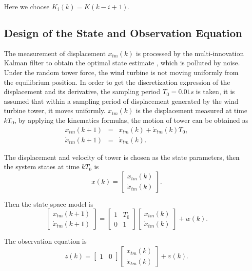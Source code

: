 Here we choose $K_i(k) = K(k-i+1)$.

\subsection{Design of the State and Observation Equation}

The measurement of displacement $x_{tm}(k)$ is processed by the multi-innovation
Kalman filter to obtain the optimal state estimate
, which is polluted by noise. Under the random tower force, the wind turbine
is not moving uniformly from the equilibrium position. In order to get the
discretization expression of the displacement and its derivative, the sampling
period $T_0=0.01s$ is taken, it is assumed that within a sampling period of
displacement generated by the wind turbine tower, it moves uniformly.
$x_{tm}(k)$ is the displacement measured at time $kT_0$, by applying the
kinematics formulas, the motion of tower can be obtained as
\begin{eqnarray}
  x_{tm}(k+1) &=& x_{tm}(k) + \dot{x}_{tm}(k)T_0, \\
  \dot{x}_{tm}(k+1) &=& \dot{x}_{tm}(k).
\end{eqnarray}

The displacement and velocity of tower is chosen as the state parameters, then
the system states at time $kT_0$ is
\begin{equation}
  x(k) =
  \begin{bmatrix}
    x_{tm}(k) \\
    \dot{x}_{tm}(k)
  \end{bmatrix}.
\end{equation}

Then the state space model is
\begin{equation}
  \begin{bmatrix}
    x_{tm}(k+1) \\
    \dot{x}_{tm}(k+1)
  \end{bmatrix}
  =
  \begin{bmatrix}
    1 & T_0 \\
    0 & 1
  \end{bmatrix}
  \begin{bmatrix}
    x_{tm}(k) \\
    \dot{x}_{tm}(k)
  \end{bmatrix} + w(k).
\end{equation}

The observation equation is
\begin{equation}
  z(k) =
  \begin{bmatrix}
    1 & 0
  \end{bmatrix}
  \begin{bmatrix}
    x_{tm}(k) \\
    \dot{x}_{tm}(k)
  \end{bmatrix} + v(k).
\end{equation}

